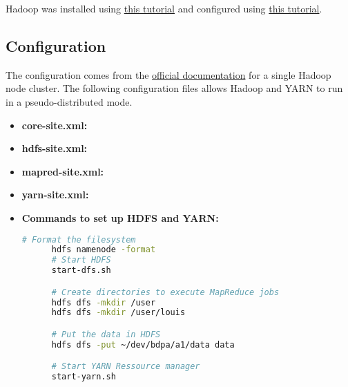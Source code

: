 \documentclass[a4paper,10pt]{article}
\begin{document}
Hadoop was installed using \href{https://www.digitalocean.com/community/tutorials/how-to-install-hadoop-in-stand-alone-mode-on-ubuntu-16-04}{this tutorial} and configured using \href{https://hadoop.apache.org/docs/stable/hadoop-project-dist/hadoop-common/SingleCluster.html}{this tutorial}.


\subsection{Configuration}
The configuration comes from the \href{https://hadoop.apache.org/docs/stable/hadoop-project-dist/hadoop-common/SingleCluster.html}{official documentation} for a single Hadoop node cluster.
The following configuration files allows Hadoop and YARN to run in a pseudo-distributed mode.
\begin{itemize}
    \item \textbf{core-site.xml:}
    
    \item \textbf{hdfs-site.xml:}
    
    \item \textbf{mapred-site.xml:}
    
    \item \textbf{yarn-site.xml:}
    
    \item \textbf{Commands to set up HDFS and YARN:}
    \begin{lstlisting}[language=bash]
      # Format the filesystem
      hdfs namenode -format
      # Start HDFS
      start-dfs.sh

      # Create directories to execute MapReduce jobs
      hdfs dfs -mkdir /user
      hdfs dfs -mkdir /user/louis

      # Put the data in HDFS
      hdfs dfs -put ~/dev/bdpa/a1/data data

      # Start YARN Ressource manager
      start-yarn.sh
    \end{lstlisting}
\end{itemize}
\end{document}
